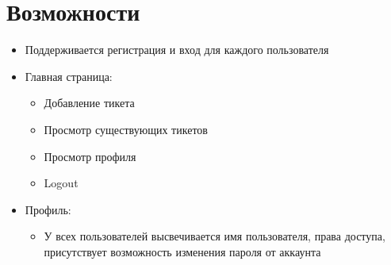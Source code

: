 \documentclass[a4paper,14pt]{extarticle} %
\begin{document}
\section{Возможности} 
\begin{itemize} 
\item{Поддерживается регистрация и вход для каждого пользователя}
\item{Главная страница:} 
\begin{itemize} 
\item{Добавление тикета}
\item{Просмотр существующих тикетов}
\item{Просмотр профиля}
\item{Logout}
\end{itemize} 
\item{Профиль:}
\begin{itemize}
\item{У всех пользователей высвечивается имя пользователя, права доступа, присутствует возможность изменения пароля от аккаунта}
\end{itemize}

\end{itemize}
\end{document}
